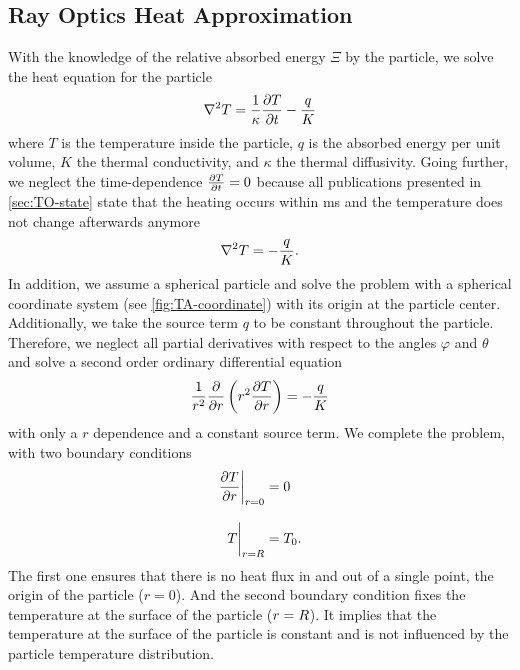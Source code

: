 \subsection{Ray Optics Heat Approximation}

With the knowledge of the relative absorbed energy $\Xi$ by the particle, we 
solve the heat equation for the particle
\begin{equation}
  \laplacian{T} = \frac{1}{\kappa} \pdv{T}{t} - \frac{q}{K}
  \label{eq:TO-heat-prob}
\end{equation}
where $T$ is the temperature inside the particle, $q$ is the absorbed energy 
per unit volume, $K$ the thermal conductivity, and $\kappa$ the thermal 
diffusivity. Going further, we neglect the time-dependence $\pdv{T}{t}= 0$ 
because all publications presented in \cref{sec:TO-state} state that the 
heating occurs within \si{\ms} and the temperature does not change afterwards 
anymore \begin{equation}
  \laplacian{T} = - \frac{q}{K}.
  \label{eq:TO-heat-stat}
\end{equation}
 In addition, we assume a spherical particle and solve the problem with a 
 spherical coordinate system (see \cref{fig:TA-coordinate}) with its origin at 
 the particle center. Additionally, we take the source term $q$ to be constant 
 throughout the particle. Therefore, we neglect all partial derivatives with 
 respect to the angles $\varphi$ and $\theta$ and solve a second order ordinary 
 differential equation
 \begin{equation}
    \frac{1}{r^{2}}\pdv{r}\left( r^{2}\pdv{T}{r} \right) = - \frac{q}{K}
  \label{eq:TO-heat-spherical}
\end{equation}
with only a $r$ dependence and a constant source term. We complete the problem, 
with two boundary conditions
\begin{subequations}
\begin{align}
  \eval{\pdv{T}{r}}_{r=0} &= 0\\[3mm]
  \eval{T}_{r=\R} &= T_{0}.
\end{align}
\end{subequations}
The first one ensures that there is no heat flux in and out of a single point, 
the origin of the particle ($r=0$). And the second boundary condition fixes the 
temperature at the surface of the particle ($r=R$). It implies that the 
temperature at the surface of the particle is constant and is not influenced by 
the particle temperature distribution.

